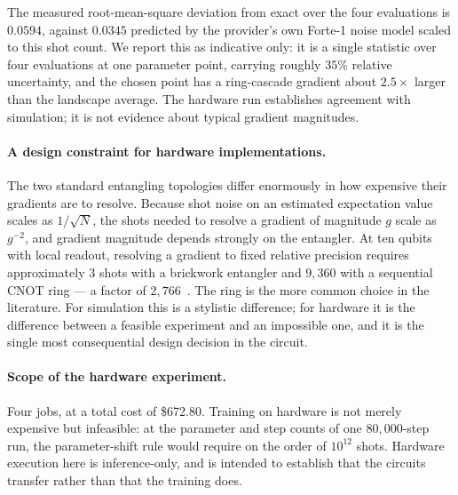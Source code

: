 \documentclass[11pt,onecolumn]{article}
\begin{document}
The measured root-mean-square deviation from exact over the four
evaluations is $0.0594$, against $0.0345$ predicted by the provider's
own Forte-1 noise model scaled to this shot count. We report this as
indicative only: it is a single statistic over four evaluations at one
parameter point, carrying roughly $35\%$ relative uncertainty, and the
chosen point has a ring-cascade gradient about $2.5\times$ larger than
the landscape average. The hardware run establishes agreement with
simulation; it is not evidence about typical gradient magnitudes.

\paragraph{A design constraint for hardware implementations.}
The two standard entangling topologies differ enormously in how
expensive their gradients are to resolve. Because shot noise on an
estimated expectation value scales as $1/\sqrt{N}$, the shots needed to
resolve a gradient of magnitude $g$ scale as $g^{-2}$, and gradient
magnitude depends strongly on the entangler. At ten qubits with local
readout, resolving a gradient to fixed relative precision requires
approximately $3$ shots with a brickwork entangler and $9{,}360$ with a
sequential CNOT ring --- a factor of $2{,}766$~\cite{papera}. The ring
is the more common choice in the literature. For simulation this is a
stylistic difference; for hardware it is the difference between a
feasible experiment and an impossible one, and it is the single most
consequential design decision in the circuit.

\paragraph{Scope of the hardware experiment.}
Four jobs, at a total cost of \$672.80. Training on hardware is not
merely expensive but infeasible: at the parameter and step counts of one
$80{,}000$-step run, the parameter-shift rule would require on the order
of $10^{12}$ shots. Hardware execution here is inference-only, and is
intended to establish that the circuits transfer rather than that the
training does.

\end{document}
